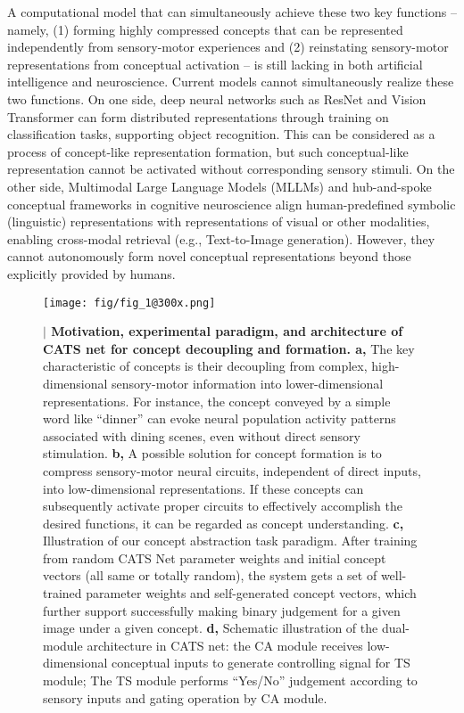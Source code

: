 \documentclass[pdflatex,sn-mathphys-num,lineno]{sn-jnl}%
\begin{document}
\begin{CJK}{UTF8}{gbsn}
A computational model that can simultaneously achieve these two key functions – namely, (1) forming highly compressed concepts that can be represented independently from sensory-motor experiences and (2) reinstating sensory-motor representations from conceptual activation – is still lacking in both artificial intelligence and neuroscience. Current models cannot simultaneously realize these two functions. On one side, deep neural networks such as ResNet and Vision Transformer \cite{he_deep_2016,dosovitskiy_image_2021} can form distributed representations through training on classification tasks, supporting object recognition. This can be considered as a process of concept-like representation formation, but such conceptual-like representation cannot be activated without corresponding sensory stimuli. On the other side, Multimodal Large Language Models (MLLMs) \cite{radford_learning_2021,li_blip-2_2023,wu_deepseek-vl2_2024} and hub-and-spoke conceptual frameworks in cognitive neuroscience \cite{ralph_neural_2017,jackson_reverse-engineering_2021} align human-predefined symbolic (linguistic) representations with representations of visual or other modalities, enabling cross-modal retrieval (e.g., Text-to-Image generation). However, they cannot autonomously form novel conceptual representations beyond those explicitly provided by humans.

\begin{figure}[htbp]
\centering
\texttt{[image: fig/fig\_1@300x.png]}
\caption{\textbf{$\vert$ Motivation, experimental paradigm, and architecture of CATS net for concept decoupling and  formation. a,} The key characteristic of concepts is their decoupling from complex, high-dimensional sensory-motor information into lower-dimensional representations. For instance, the concept conveyed by a simple word like “dinner” can evoke neural population activity patterns associated with dining scenes, even without direct sensory stimulation. \textbf{b,}  A possible solution for concept formation is to compress sensory-motor neural circuits, independent of direct inputs, into low-dimensional representations. If these concepts can subsequently activate proper circuits to effectively accomplish the desired functions, it can be regarded as concept understanding. \textbf{c,} Illustration of our concept abstraction task paradigm. After training from random CATS Net parameter weights and initial concept vectors (all same or totally random), the system gets a set of well-trained parameter weights and self-generated concept vectors, which further support successfully making binary judgement for a given image under a given concept. \textbf{d,} Schematic illustration of the dual-module architecture in CATS net: the CA module receives low-dimensional conceptual inputs to generate controlling signal for TS module; The TS module performs “Yes/No” judgement according to sensory inputs and gating operation by CA module.}
\label{fig1}
\end{figure}



\end{CJK}
\end{document}
